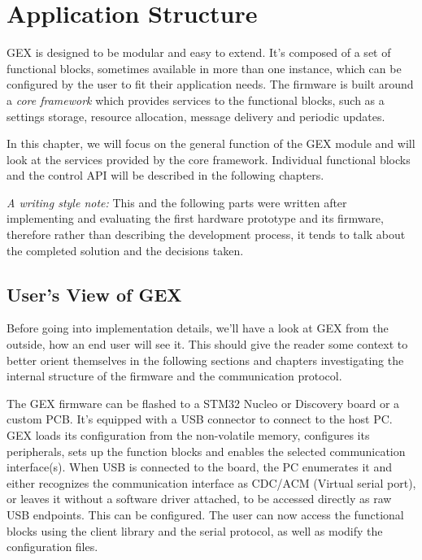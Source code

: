 \chapter{Application Structure}

GEX is designed to be modular and easy to extend. It's composed of a set of functional blocks, sometimes available in more than one instance, which can be configured by the user to fit their application needs. The firmware is built around a \textit{core framework} which provides services to the functional blocks, such as a settings storage, resource allocation, message delivery and periodic updates.

In this chapter, we will focus on the general function of the GEX module and will look at the services provided by the core framework. Individual functional blocks and the control API will be described in the following chapters.

\textit{A writing style note:} This and the following parts were written after implementing and evaluating the first hardware prototype and its firmware, therefore rather than describing the development process, it tends to talk about the completed solution and the decisions taken.

\section{User's View of GEX}

Before going into implementation details, we'll have a look at GEX from the outside, how an end user will see it. This should give the reader some context to better orient themselves in the following sections and chapters investigating the internal structure of the firmware and the communication protocol.

The GEX firmware can be flashed to a STM32 Nucleo or Discovery board or a custom PCB. It's equipped with a USB connector to connect to the host PC.  GEX loads its configuration from the non-volatile memory, configures its peripherals, sets up the function blocks and enables the selected communication interface(s). When USB is connected to the board, the PC enumerates it and either recognizes the communication interface as CDC/ACM (Virtual serial port), or leaves it without a software driver attached, to be accessed directly as raw USB endpoints. This can be configured. The user can now access the functional blocks using the client library and the serial protocol, as well as modify the configuration files.

